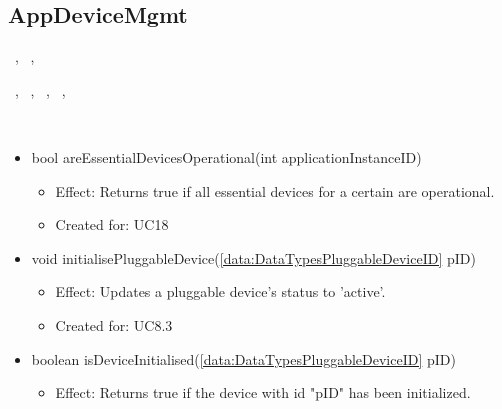   \subsection{AppDeviceMgmt}\label{int:GatewayGatewayDeviceManagerAppDeviceMgmt}
    \begin{description}
      \item[Provided by:] \iconcomponent{}~, \iconcomponent{}~, \iconcomponent{}~
      \item[Required by:] \iconcomponent{}~, \iconcomponent{}~, \iconcomponent{}~, \iconcomponent{}~, \iconcomponent{}~
      \item[Operations:] ~
    \begin{itemize}[noitemsep,nolistsep,leftmargin=-.25cm]
      \item \textsf{bool areEssentialDevicesOperational(int applicationInstanceID)}
        \begin{itemize}[noitemsep,nolistsep]
           \item Effect: Returns true if all essential devices for a certain  are operational.
\item Created for: UC18
        \end{itemize}
      \item \textsf{void initialisePluggableDevice(\ref{data:DataTypesPluggableDeviceID} pID)}
        \begin{itemize}[noitemsep,nolistsep]
           \item Effect: Updates a pluggable device's status to 'active'.
\item Created for: UC8.3
        \end{itemize}
      \item \textsf{boolean isDeviceInitialised(\ref{data:DataTypesPluggableDeviceID} pID)}
        \begin{itemize}[noitemsep,nolistsep]
           \item Effect: Returns true if the device with id "pID" has been initialized.

\end{itemize}
\end{itemize}
\end{description}

